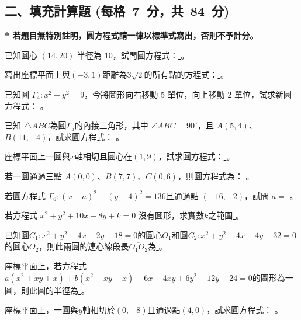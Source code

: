 \documentclass[b4paper,12pt]{exam}
\newif\ifshowAnswer
\newcommand{\colorAnswer}[2]{%
{
  \makebox[6em][c]{%
    \ifshowAnswer
      {\color{#1}#2}%
    \else
      \phantom{#2}%
    \fi
  }}%
}
\begin{document}
\subsection*{二、填充計算題 (每格\ 7\ 分，共\ 84\ 分)}
\textbf{* 若題目無特別註明，圓方程式請一律以標準式寫出，否則不予計分。}
\begin{enumerate}[itemsep=1em, topsep=2em]
    \item 已知圓心 $(14,20)$ 半徑為 $10$，試問圓方程式：\underline{\colorAnswer{red}{$?$}}。

    \item 寫出座標平面上與$(-3,1)$距離為$3\sqrt{2}$的所有點的方程式：\underline{\colorAnswer{red}{$?$}}。

    \item 已知圓 $\Gamma_4:x^2+y^2=9$，今將圖形向右移動 $5$ 單位，向上移動 $2$ 單位，試求新圓方程式：\underline{\colorAnswer{red}{$?$}}。
    
    \item 已知 $\triangle ABC$為圓$\Gamma_5$的內接三角形，其中 $\angle ABC=90^\circ$，且 $A(5,4)$、$B(11,-4)$，試求圓方程式：\underline{\colorAnswer{red}{$?$}}。

    \item 座標平面上一圓與$x$軸相切且圓心在$(1,9)$，試求圓方程式：\underline{\colorAnswer{red}{$?$}}。

    \item 若一圓通過三點 $A(0,0)$、$B(7,7)$、$C(0,6)$，則圓方程式為：\underline{\colorAnswer{red}{$?$}}。

    \item 若圓方程式 $\Gamma_6:(x-a)^2+(y-4)^2=136$且通過點 $(-16,-2)$，試問 $a=$\underline{\colorAnswer{red}{$?$}}。

    \item 若方程式 $x^2+y^2+10x-8y+k=0$ 沒有圖形，求實數$k$之範圍\underline{\colorAnswer{red}{$?$}}。

    \item 已知圓$C_1:x^2+y^2-4x-2y-18=0$的圓心$O_1$和圓$C_2:x^2+y^2+4x+4y-32=0$的圓心$O_2$，則此兩圓的連心線段長$\overline{O_1O_2}$為\underline{\colorAnswer{red}{$?$}}。

    \item 座標平面上，若方程式 $a(x^2+xy+x)+b(x^2-xy+x)-6x-4xy+6y^2+12y-24=0$的圖形為一圓，則此圓的半徑為\underline{\colorAnswer{red}{$?$}}。
    
    \vspace{1em}

    \begin{minipage}[t]{0.7\linewidth}
        \item 座標平面上，一圓與$y$軸相切於$(0,-8)$且通過點$(4,0)$，試求圓方程式：\underline{\colorAnswer{red}{$?$}}。 
        

\end{minipage}
\end{enumerate}
\end{document}

